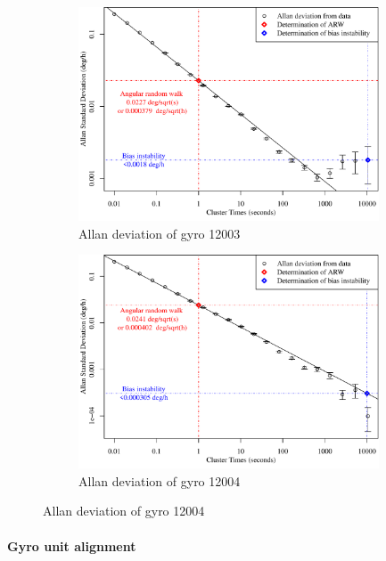 \begin{figure}[!ht]
	\begin{subfigure}[b]{0.5\textwidth}
		\centering
		\includegraphics[width=0.98\textwidth]{Figures/allandev_12003.pdf} 
		\caption{Allan deviation of gyro 12003}
		\label{subfig:allan12003}
	\end{subfigure}
	\begin{subfigure}[b]{0.5\textwidth}
		\centering
		\includegraphics[width=0.98\textwidth]{Figures/allandev_12004.pdf} 
		\caption{Allan deviation of gyro 12004}
		\label{subfig:allan12004}
	\end{subfigure}

\end{figure}

\paragraph{Gyro unit alignment}



